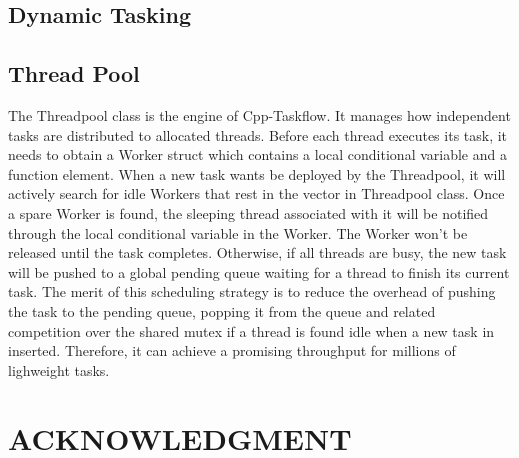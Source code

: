 \documentclass[sigconf]{acmart}
\begin{document}
\subsection{Dynamic Tasking}


\subsection{Thread Pool}

  The Threadpool class is the engine of Cpp-Taskflow. It manages how independent tasks are distributed to
allocated threads. Before each thread executes its task, it needs to obtain a Worker struct which contains 
a local conditional variable and a function element. When a new task wants be deployed by the Threadpool, it
 will actively search for idle Workers that rest in the vector in Threadpool class. Once a spare Worker is found, 
the sleeping thread associated with it will be notified through the local conditional variable in the Worker. The Worker
won't be released until the task completes. Otherwise, if all threads are busy, 
the new task will be pushed to a global pending queue waiting for a thread to finish its current task. The merit of 
this scheduling strategy is to reduce the overhead of pushing the task to the pending queue, popping it from the queue and related competition 
over the shared mutex
if a thread is found idle when a new task in inserted. Therefore, it can achieve a promising throughput for millions of lighweight tasks. 

\section{ACKNOWLEDGMENT}




%
%


\end{document}
